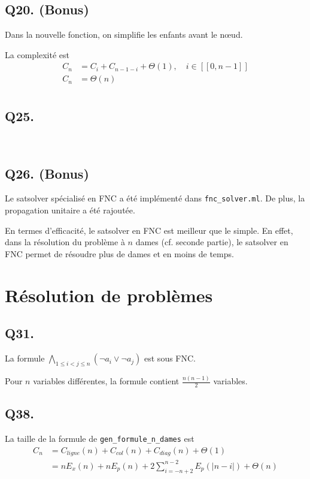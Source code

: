 \subsection*{Q20. (Bonus)}
Dans la nouvelle fonction, on simplifie les enfants avant le nœud.

La complexité est
\begin{align*}
    C_n &= C_{i} + C_{n-1-i} + \Theta(1), \quad i \in [\![0,n-1]\!]\\
    C_n &= \boxed{\Theta(n)}\\
\end{align*}

\subsection*{Q25.}~

\subsection*{Q26. (Bonus)}
Le satsolver spécialisé en FNC a été implémenté dans \verb|fnc_solver.ml|.
De plus, la propagation unitaire a été rajoutée.

En termes d'efficacité, le satsolver en FNC est meilleur que le simple.
En effet, dans la résolution du problème à $n$ dames (cf. seconde partie),
le satsolver en FNC permet de résoudre plus de dames et en moins de temps.

\section{Résolution de problèmes}
\subsection*{Q31.}
La formule
$\boxed{\bigwedge\limits_{1 \leq i < j \leq n}\left(\lnot a_i \lor \lnot a_j\right)}$
est sous FNC.

Pour $n$ variables différentes, la formule contient $\frac{n(n-1)}{2}$ variables.

\subsection*{Q38.}
La taille de la formule de \verb|gen_formule_n_dames| est
\begin{align*}
    C_n &= C_{ligne}(n) + C_{col}(n) + C_{diag}(n) + \Theta(1)\\
    &= nE_x(n) + nE_p(n) + 2\sum_{i=-n+2}^{n-2}E_p(|n-i|) + \Theta(n)\\
\end{align*}

